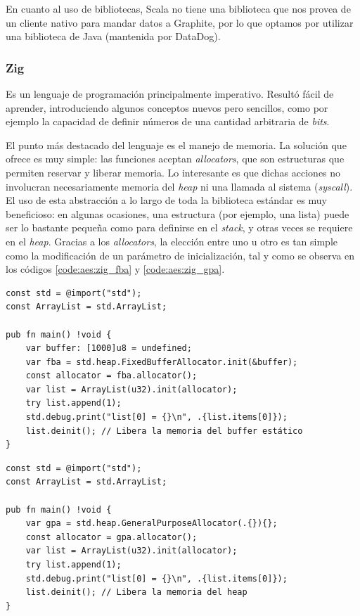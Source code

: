 \documentclass[11pt]{article}
\let\Oldsubsubsection\subsubsection
\renewcommand{\subsubsection}{\FloatBarrier\Oldsubsubsection}
\newcommand{\english}[1]{\textit{#1}}
\begin{document}
En cuanto al uso de bibliotecas, Scala no tiene una biblioteca que nos provea de un cliente nativo para mandar datos a Graphite, por lo que optamos por utilizar una biblioteca de Java (mantenida por DataDog).

\subsubsection{Zig}

Es un lenguaje de programación principalmente imperativo. Resultó fácil de aprender, introduciendo algunos conceptos nuevos pero sencillos, como por ejemplo la capacidad de definir números de una cantidad arbitraria de \english{bits}.

El punto más destacado del lenguaje es el manejo de memoria. La solución que ofrece es muy simple: las funciones aceptan \english{allocators}, que son estructuras que permiten reservar y liberar memoria. Lo interesante es que dichas acciones no involucran necesariamente memoria del \english{heap} ni una llamada al sistema (\english{syscall}). El uso de esta abstracción a lo largo de toda la biblioteca estándar es muy beneficioso: en algunas ocasiones, una estructura (por ejemplo, una lista) puede ser lo bastante pequeña como para definirse en el \english{stack}, y otras veces se requiere en el \english{heap}. Gracias a los \english{allocators}, la elección entre uno u otro es tan simple como la modificación de un parámetro de inicialización, tal y como se observa en los códigos \ref{code:aes:zig_fba} y \ref{code:aes:zig_gpa}.

\begin{listing}[h]
\begin{verbatim}
const std = @import("std");
const ArrayList = std.ArrayList;

pub fn main() !void {
    var buffer: [1000]u8 = undefined;
    var fba = std.heap.FixedBufferAllocator.init(&buffer);
    const allocator = fba.allocator();
    var list = ArrayList(u32).init(allocator);
    try list.append(1);
    std.debug.print("list[0] = {}\n", .{list.items[0]});
    list.deinit(); // Libera la memoria del buffer estático
}
\end{verbatim}
\caption{Inicialización de una lista en el \english{stack} por medio de un \lstinline{FixedBufferAllocator}, en Zig}
\label{code:aes:zig_fba}
\end{listing}

\begin{listing}[h]
\begin{verbatim}
const std = @import("std");
const ArrayList = std.ArrayList;

pub fn main() !void {
    var gpa = std.heap.GeneralPurposeAllocator(.{}){};
    const allocator = gpa.allocator();
    var list = ArrayList(u32).init(allocator);
    try list.append(1);
    std.debug.print("list[0] = {}\n", .{list.items[0]});
    list.deinit(); // Libera la memoria del heap
}
\end{verbatim}
\caption{Inicialización de una lista en el \english{heap} por medio de un \lstinline{GeneralPurposeAllocator}, en Zig}
\label{code:aes:zig_gpa}
\end{listing}
\end{document}
